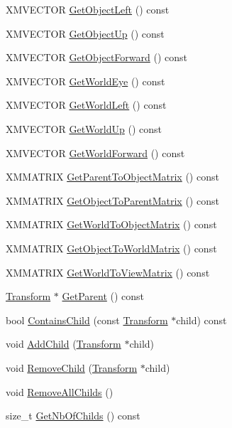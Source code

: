 \begin{DoxyCompactItemize}
\item 
X\+M\+V\+E\+C\+T\+OR \hyperlink{structmage_1_1_transform_a12946ff32c7044889f7c89c9182dba76}{Get\+Object\+Left} () const
\item 
X\+M\+V\+E\+C\+T\+OR \hyperlink{structmage_1_1_transform_a68a9a599104b976b01aea39cc8ab03d2}{Get\+Object\+Up} () const
\item 
X\+M\+V\+E\+C\+T\+OR \hyperlink{structmage_1_1_transform_affc4bcfe6ca76005db8676de867aede0}{Get\+Object\+Forward} () const
\item 
X\+M\+V\+E\+C\+T\+OR \hyperlink{structmage_1_1_transform_a41ba0976f707bc9bcfa646e53d7e9507}{Get\+World\+Eye} () const
\item 
X\+M\+V\+E\+C\+T\+OR \hyperlink{structmage_1_1_transform_aef18a0e685f56ce4a805b2fef57287f6}{Get\+World\+Left} () const
\item 
X\+M\+V\+E\+C\+T\+OR \hyperlink{structmage_1_1_transform_af28786b745a144eef74d69a55055b00a}{Get\+World\+Up} () const
\item 
X\+M\+V\+E\+C\+T\+OR \hyperlink{structmage_1_1_transform_a24bd3a710a3c0bde7a6d2f2de56a315c}{Get\+World\+Forward} () const
\item 
X\+M\+M\+A\+T\+R\+IX \hyperlink{structmage_1_1_transform_a66eee9c51ff050924d35c3747083593f}{Get\+Parent\+To\+Object\+Matrix} () const
\item 
X\+M\+M\+A\+T\+R\+IX \hyperlink{structmage_1_1_transform_a8da2bed8599b4f012ac85af9d76c7f37}{Get\+Object\+To\+Parent\+Matrix} () const
\item 
X\+M\+M\+A\+T\+R\+IX \hyperlink{structmage_1_1_transform_a773c1db9e475deb6d9f446a88cfae30f}{Get\+World\+To\+Object\+Matrix} () const
\item 
X\+M\+M\+A\+T\+R\+IX \hyperlink{structmage_1_1_transform_a6fe97738bf9ae9d1e677c3e09b8c6d81}{Get\+Object\+To\+World\+Matrix} () const
\item 
X\+M\+M\+A\+T\+R\+IX \hyperlink{structmage_1_1_transform_a33cc590d779f69044d183bab653bd260}{Get\+World\+To\+View\+Matrix} () const
\item 
\hyperlink{structmage_1_1_transform}{Transform} $\ast$ \hyperlink{structmage_1_1_transform_a9ad6f03ef7e41ddfe1af7ac2dd0c263c}{Get\+Parent} () const
\item 
bool \hyperlink{structmage_1_1_transform_af96fd453b15766d7fffae5d8bba8ba60}{Contains\+Child} (const \hyperlink{structmage_1_1_transform}{Transform} $\ast$child) const
\item 
void \hyperlink{structmage_1_1_transform_ad3f02e778de604f907041218bd2dab0c}{Add\+Child} (\hyperlink{structmage_1_1_transform}{Transform} $\ast$child)
\item 
void \hyperlink{structmage_1_1_transform_ac893db298021d39fd10a42b95d1de14f}{Remove\+Child} (\hyperlink{structmage_1_1_transform}{Transform} $\ast$child)
\item 
void \hyperlink{structmage_1_1_transform_a1f9e00affb4b41338a6a946867a1d5a4}{Remove\+All\+Childs} ()
\item 
size\+\_\+t \hyperlink{structmage_1_1_transform_a9374ee1896e1006b81e7643a1c1dc967}{Get\+Nb\+Of\+Childs} () const
\end{DoxyCompactItemize}
